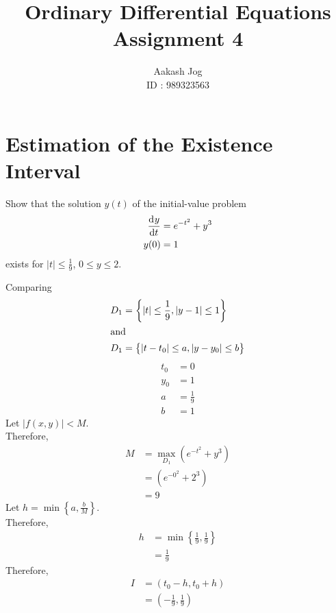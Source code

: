 \documentclass[fleqn, a4paper, 11pt, oneside]{amsart}
\title{Ordinary Differential Equations\\Assignment 4}
\author
{
	Aakash Jog\\
	ID : 989323563
}
\date{\formatdate{11}{5}{2015}}
\theoremstyle{definition}
\theoremstyle{theorem}
\begin{document}
	
\maketitle

\part{Estimation of the Existence Interval}

\begin{question}
	Show that the solution $y(t)$ of the initial-value problem
	\begin{align*}
		\dod{y}{t} & = e^{-t^2} + y^3 \\
		y(0)       & = 1
	\end{align*}
	exists for $|t| \le \frac{1}{9}$, $0 \le y \le 2$.
\end{question}

\begin{solution}
	Comparing
	\begin{align*}
		D_1 & = \left\{ |t| \le \frac{1}{9} , |y - 1| \le 1 \right\} \\
		\intertext{and}
		D_1 & = \left\{ |t - t_0| \le a , |y - y_0| \le b \right\}
	\end{align*}
	\begin{align*}
		t_0 & = 0           \\
		y_0 & = 1           \\
		a   & = \frac{1}{9} \\
		b   & = 1
	\end{align*}
	Let $|f(x,y)| < M$.\\
	Therefore,
	\begin{align*}
		M & = \max\limits_{D_1} (e^{-t^2} + y^3) \\
                  & = (e^{-0^2} + 2^3)                   \\
                  & = 9
	\end{align*}
	Let $h = \min \left\{ a, \frac{b}{M} \right\}$.\\
	Therefore,
	\begin{align*}
		h & = \min \left\{ \frac{1}{9} , \frac{1}{9} \right\} \\
                  & = \frac{1}{9}
	\end{align*}
	Therefore,
	\begin{align*}
		I & = (t_0 - h, t_0 + h) \\
                  & = \left( -\frac{1}{9} , \frac{1}{9} \right)
	\end{align*}
\end{solution}
\end{document}
